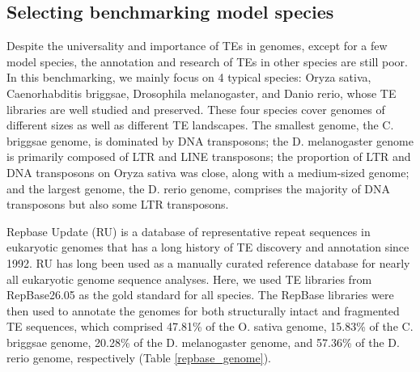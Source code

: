 \documentclass{bmcart}
\begin{document}
\subsection*{Selecting benchmarking model species}
Despite the universality and importance of TEs in genomes, except for a few model species, the annotation and research of TEs in other species are still poor. In this benchmarking, we mainly focus on 4 typical species: Oryza sativa, Caenorhabditis briggsae, Drosophila melanogaster, and Danio rerio, whose TE libraries are well studied and preserved. These four species cover genomes of different sizes as well as different TE landscapes. The smallest genome, the C. briggsae genome, is dominated by DNA transposons; the D. melanogaster genome is primarily composed of LTR and LINE transposons; the proportion of LTR and DNA transposons on Oryza sativa was close, along with a medium-sized genome; and the largest genome, the D. rerio genome, comprises the majority of DNA transposons but also some LTR transposons.

Repbase Update (RU) is a database of representative repeat sequences in eukaryotic genomes that has a long history of TE discovery and annotation since 1992\cite{bao2015repbase}. RU has long been used as a manually curated reference database for nearly all eukaryotic genome sequence analyses. Here, we used TE libraries from RepBase26.05 as the gold standard for all species. The RepBase libraries were then used to annotate the genomes for both structurally intact and fragmented TE sequences, which comprised 47.81\% of the O. sativa genome, 15.83\% of the C. briggsae genome, 20.28\% of the D. melanogaster genome, and 57.36\% of the D. rerio genome, respectively (Table \ref{repbase_genome}). 
\end{document}
